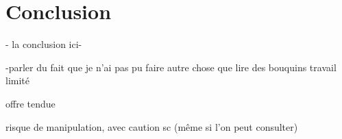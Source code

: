 
\chapter*{Conclusion}

- la conclusion ici-

-parler du fait que je n'ai pas pu faire autre chose que lire des bouquins
travail limité

offre tendue

risque de manipulation, avec caution sc (même si l'on peut consulter)
